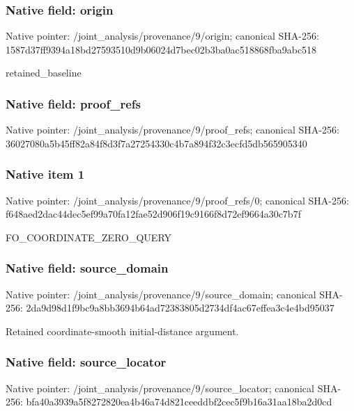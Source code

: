 \documentclass[10pt,a4paper]{article}
\begin{document}
\subsubsection{Native field: origin}
Native pointer: /joint\_\allowbreak{}analysis/provenance/9/origin; canonical SHA-256: 1587d37ff9394a18bd27593510d9b06024d7bec02b3ba0ac518868fba9abc518

\begingroup\raggedright\sloppy retained\_\allowbreak{}baseline\par\endgroup

\subsubsection{Native field: proof\_\allowbreak{}refs}
Native pointer: /joint\_\allowbreak{}analysis/provenance/9/proof\_\allowbreak{}refs; canonical SHA-256: 36027080a5b45ff82a84f8d3f7a27254330c4b7a894f32c3ecfd5db565905340

\subsubsection{Native item 1}
Native pointer: /joint\_\allowbreak{}analysis/provenance/9/proof\_\allowbreak{}refs/0; canonical SHA-256: f648aed2dac44dec5ef99a70fa12fae52d906f19c9166f8d72ef9664a30c7b7f

\begingroup\raggedright\sloppy FO\_\allowbreak{}COORDINATE\_\allowbreak{}ZERO\_\allowbreak{}QUERY\par\endgroup

\subsubsection{Native field: source\_\allowbreak{}domain}
Native pointer: /joint\_\allowbreak{}analysis/provenance/9/source\_\allowbreak{}domain; canonical SHA-256: 2da9d98d1f9bc9a8bb3694b64ad72383805d2734df4ac67effea3c4e4bd95037

\begingroup\raggedright\sloppy Retained coordinate-smooth initial-distance argument.\par\endgroup

\subsubsection{Native field: source\_\allowbreak{}locator}
Native pointer: /joint\_\allowbreak{}analysis/provenance/9/source\_\allowbreak{}locator; canonical SHA-256: bfa40a3939a5f8272820ea4b46a74d821ceeddbf2cec5f9b16a31aa18ba2d0cd
\end{document}
